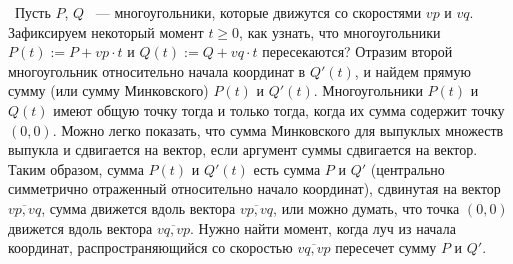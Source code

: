\indent\indent\ Пусть $P$, $Q$ ~--- многоугольники, которые движутся
со скоростями $vp$ и $vq$.
Зафиксируем некоторый момент $t \ge 0$, как узнать, что многоугольники
$P(t) := P + vp \cdot t$ и $Q(t) := Q + vq \cdot t$ пересекаются?
Отразим второй многоугольник относительно начала координат в $Q'(t)$,
и найдем прямую сумму (или сумму Минковского) $P(t)$ и $Q'(t)$. Многоугольники
$P(t)$ и $Q(t)$ имеют общую точку тогда и только тогда, когда их сумма
содержит точку $(0, 0)$. Можно легко показать, что сумма Минковского для
выпуклых множеств выпукла и сдвигается на вектор, если аргумент суммы
сдвигается на вектор. Таким образом, сумма $P(t)$ и $Q'(t)$ есть сумма
$P$ и $Q'$ (центрально симметрично отраженный относительно начало координат),
сдвинутая на вектор $\overline{vp,vq}$,
сумма движется вдоль вектора $\overline{vp,vq}$, или
можно думать, что точка $(0, 0)$ движется вдоль вектора $\overline{vq,vp}$.
Нужно найти момент, когда луч из начала координат, распространяющийся
со скоростью $\overline{vq,vp}$ пересечет сумму $P$ и $Q'$.

